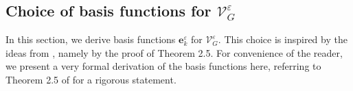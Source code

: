 \documentclass[]{article}
\numberwithin{equation}{section}
\numberwithin{theorem}{section}
\numberwithin{lemma}{section}
\numberwithin{corollary}{section}
\numberwithin{proposition}{section}
\numberwithin{definition}{section}
\newcommand{\re}{\varepsilon}
\renewcommand{\vec}{\boldsymbol}
\begin{document}
	\subsection{Choice of basis functions for $\mathcal{V}^{\re}_G$}
	\label{sec:asymtpotic_galerkin}
	In this section, we derive basis functions $\vec{e}_k^{\re}$ for $\mathcal{V}^{\re}_G$. This choice is inspired by the ideas from \cite{sini_time_domain}, namely by the proof of Theorem 2.5. For convenience of the reader, we present a very formal derivation of the basis functions here, referring to Theorem 2.5 of \cite{sini_time_domain} for a rigorous statement. 
	
\end{document}
